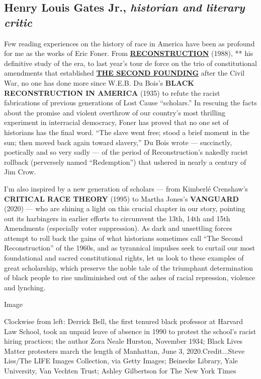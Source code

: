 \hypertarget{henry-louis-gates-jr-historian-and-literary-critic}{%
\subsection{\texorpdfstring{Henry Louis Gates Jr., \emph{historian and
literary
critic}}{Henry Louis Gates Jr., historian and literary critic}}\label{henry-louis-gates-jr-historian-and-literary-critic}}

Few reading experiences on the history of race in America have been as
profound for me as the works of Eric Foner. From
\textbf{\href{https://www.nytimes.com/1988/05/22/books/a-moment-of-terrifying-promise.html}{RECONSTRUCTION}}
(1988), ** his definitive study of the era, to last year's tour de force
on the trio of constitutional amendments that established
\textbf{\href{https://www.nytimes.com/2019/09/18/books/review/the-second-founding-eric-foner.html}{THE
SECOND FOUNDING}} after the Civil War, no one has done more since W.E.B.
Du Bois's \textbf{BLACK RECONSTRUCTION IN AMERICA} (1935) to refute the
racist fabrications of previous generations of Lost Cause ``scholars.''
In rescuing the facts about the promise and violent overthrow of our
country's most thrilling experiment in interracial democracy, Foner has
proved that no one set of historians has the final word. ``The slave
went free; stood a brief moment in the sun; then moved back again toward
slavery,'' Du Bois wrote --- succinctly, poetically and so very sadly
--- of the period of Reconstruction's nakedly racist rollback
(perversely named ``Redemption'') that ushered in nearly a century of
Jim Crow.

I'm also inspired by a new generation of scholars --- from Kimberlé
Crenshaw's \textbf{CRITICAL RACE THEORY} (1995) to Martha Jones's
\textbf{VANGUARD} (2020) --- who are shining a light on this crucial
chapter in our story, pointing out its harbingers in earlier efforts to
circumvent the 13th, 14th and 15th Amendments (especially voter
suppression). As dark and unsettling forces attempt to roll back the
gains of what historians sometimes call ``The Second Reconstruction'' of
the 1960s, and as tyrannical impulses seek to curtail our most
foundational and sacred constitutional rights, let us look to these
examples of great scholarship, which preserve the noble tale of the
triumphant determination of black people to rise undiminished out of the
ashes of racial repression, violence and lynching.

Image

Clockwise from left: Derrick Bell, the first tenured black professor at
Harvard Law School, took an unpaid leave of absence in 1990 to protest
the school's racist hiring practices; the author Zora Neale Hurston,
November 1934; Black Lives Matter protesters march the length of
Manhattan, June 3, 2020.Credit...Steve Liss/The LIFE Images Collection,
via Getty Images; Beinecke Library, Yale University, Van Vechten Trust;
Ashley Gilbertson for The New York Times

